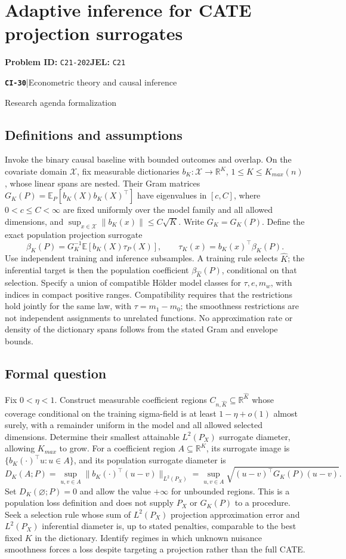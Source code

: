 \documentclass[11pt,a4paper]{article}
\newcommand{\R}{\mathbb R}
\newcommand{\E}{\mathbb E}
\newcommand{\entrymeta}[3]{{\sffamily\small\color{muted}\textbf{\texttt{#1}}\quad|\quad #2\par #3\par}}
\begin{document}
\section*{Adaptive inference for CATE projection surrogates}
\textbf{Problem ID:} \texttt{C21-202}\quad \textbf{JEL:} \texttt{C21}\par
\label{problem:OP-0509}
\label{beyond:CI-30}
\entrymeta{CI-30}{Econometric theory and causal inference}{Research agenda formalization}
\subsection*{Definitions and assumptions}
Invoke the binary causal baseline with bounded outcomes and overlap. On the covariate domain $\mathcal X$, fix measurable dictionaries $b_K:\mathcal X\to\R^K$, $1\leq K\leq K_{max}(n)$, whose linear spans are nested. Their Gram matrices $G_K(P)=\E_P[b_K(X)b_K(X)^\top]$ have eigenvalues in $[c,C]$, where $0<c\leq C<\infty$ are fixed uniformly over the model family and all allowed dimensions, and $\sup_{x\in\mathcal X}\|b_K(x)\|\leq C\sqrt K$. Write $G_K=G_K(P)$. Define the exact population projection surrogate
\[
 \beta_K(P)=G_K^{-1}\E[b_K(X)\tau_P(X)],\qquad
 \tau_K(x)=b_K(x)^\top\beta_K(P).
\]
Use independent training and inference subsamples. A training rule selects $\widehat K$; the inferential target is then the population coefficient $\beta_{\widehat K}(P)$, conditional on that selection. Specify a union of compatible H\"older model classes for $\tau,e,m_w$, with indices in compact positive ranges. Compatibility requires that the restrictions hold jointly for the same law, with $\tau=m_1-m_0$; the smoothness restrictions are not independent assignments to unrelated functions. No approximation rate or density of the dictionary spans follows from the stated Gram and envelope bounds.
\subsection*{Formal question}
Fix $0<\eta<1$. Construct measurable coefficient regions $C_{n,\widehat K}\subseteq\R^{\widehat K}$ whose coverage conditional on the training sigma-field is at least $1-\eta+o(1)$ almost surely, with a remainder uniform in the model and all allowed selected dimensions. Determine their smallest attainable $L^2(P_X)$ surrogate diameter, allowing $K_{max}$ to grow. For a coefficient region $A\subseteq\R^K$, its surrogate image is $\{b_K(\cdot)^\top u:u\in A\}$, and its population surrogate diameter is
\[
 D_K(A;P)=\sup_{u,v\in A}\|b_K(\cdot)^\top(u-v)\|_{L^2(P_X)}
 =\sup_{u,v\in A}\sqrt{(u-v)^\top G_K(P)(u-v)}.
\]
Set $D_K(\varnothing;P)=0$ and allow the value $+\infty$ for unbounded regions. This is a population loss definition and does not supply $P_X$ or $G_K(P)$ to a procedure. Seek a selection rule whose sum of $L^2(P_X)$ projection approximation error and $L^2(P_X)$ inferential diameter is, up to stated penalties, comparable to the best fixed $K$ in the dictionary. Identify regimes in which unknown nuisance smoothness forces a loss despite targeting a projection rather than the full CATE.
\end{document}
